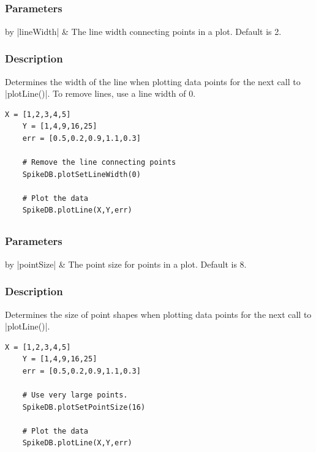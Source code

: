 \documentclass{report}
\begin{document}
\clearpage
\subsection[\method{void}{plotSetLineWidth}]{}
\subsubsection{Parameters}
\begin{table}[h]
\begin{center}
\begin{tabular}{by}
		|lineWidth| & The line width connecting points in a plot. Default is 2.\\ 
	\end{tabular}
\end{center}
\end{table}
\subsubsection{Description}
Determines the width of the line when plotting data points for the next call to |plotLine()|. To remove lines, use a line width of 0.
\begin{lstlisting}[caption=Example]
	X = [1,2,3,4,5]
	Y = [1,4,9,16,25]
	err = [0.5,0.2,0.9,1.1,0.3]

	# Remove the line connecting points
	SpikeDB.plotSetLineWidth(0)

	# Plot the data
	SpikeDB.plotLine(X,Y,err)
\end{lstlisting}


\clearpage
\subsection[\method{void}{plotSetPointSize}]{}
\subsubsection{Parameters}
\begin{table}[h]
\begin{center}
\begin{tabular}{by}
		|pointSize| & The point size for points in a plot. Default is 8.\\ 
	\end{tabular}
\end{center}
\end{table}
\subsubsection{Description}
Determines the size of point shapes when plotting data points for the next call to |plotLine()|. 
\begin{lstlisting}[caption=Example]
	X = [1,2,3,4,5]
	Y = [1,4,9,16,25]
	err = [0.5,0.2,0.9,1.1,0.3]

	# Use very large points.
	SpikeDB.plotSetPointSize(16)

	# Plot the data
	SpikeDB.plotLine(X,Y,err)
\end{lstlisting}
\end{document}
